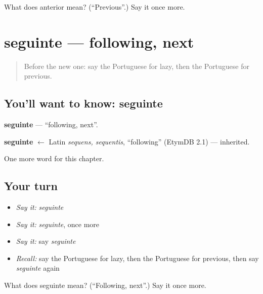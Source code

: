 \begin{tcolorbox}[breakable,colback=teal!4,colframe=teal!35!black,title={Before you move on}]
What does anterior mean? (\textquotedblleft{}Previous\textquotedblright{}.) Say it once more.
\end{tcolorbox}
\section[seguinte]{seguinte — following, next}

\label{lesson:PT-C156-seguinte}



\begin{quote}
Before the new one: say the Portuguese for lazy, then the Portuguese for previous.
\end{quote}

\subsection*{You'll want to know: seguinte}
\textbf{seguinte} — \textquotedblleft{}following, next\textquotedblright{}.

\begin{cousinweb}
\textbf{seguinte} $\leftarrow$ Latin \emph{sequens, sequentis}, \textquotedblleft{}following\textquotedblright{} (EtymDB 2.1) — inherited.
\end{cousinweb}

\begin{grammarlens}[title={What you've built}]
One more word for this chapter.
\end{grammarlens}

\subsection*{Your turn}
\begin{itemize}
\raggedright
  \item \emph{Say it:} \emph{seguinte}
  \item \emph{Say it:} \emph{seguinte}, once more
  \item \emph{Say it:} say \emph{seguinte}
  \item \emph{Recall:} say the Portuguese for lazy, then the Portuguese for previous, then say \emph{seguinte} again
\end{itemize}

\begin{tcolorbox}[breakable,colback=teal!4,colframe=teal!35!black,title={Before you move on}]
What does seguinte mean? (\textquotedblleft{}Following, next\textquotedblright{}.) Say it once more.
\end{tcolorbox}
